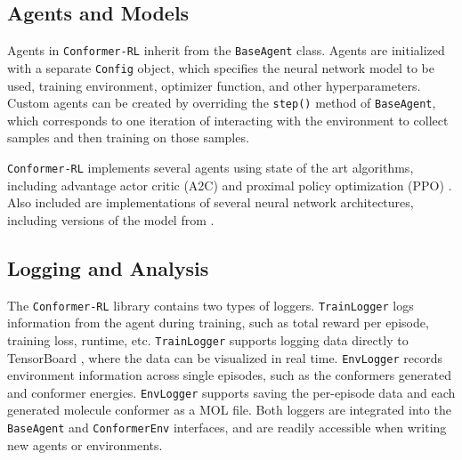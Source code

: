 \documentclass[twoside,11pt]{article}
\newcommand{\code}[1]{\texttt{#1}}
\newcommand{\titleofpaper}{Conformer-RL}
\newcommand{\genComment}[2]{\ifnum\comments=1{\color{#1}{\textsf{\footnotesize #2}}}\fi}
\newcommand{\josh}[1]{\genComment{purple}{[JK:#1]}}
\begin{document}

\subsection{Agents and Models}
Agents in \code{\titleofpaper} inherit from the \code{BaseAgent} class. Agents are initialized with a separate \code{Config} object, which specifies the neural network model to be used, training environment, optimizer function, and other hyperparameters. Custom agents can be created by overriding the \code{step()} method of \code{BaseAgent}, which corresponds to one iteration of interacting with the environment to collect samples and then training on those samples. 

\code{\titleofpaper} implements several agents using state of the art algorithms, including advantage actor critic (A2C) \citep{wu2017a2c} and proximal policy optimization (PPO) \citep{schulman2017ppo}. Also included are implementations of several neural network architectures, including versions of the model from \citep{gogineni2020torsionnet}.

\subsection{Logging and Analysis}
The \code{\titleofpaper} library contains two types of loggers. \code{TrainLogger} logs information from the agent during training, such as total reward per episode, training loss, runtime, etc. \code{TrainLogger} supports logging data directly to TensorBoard \citep{tensorflow2015-whitepaper}, where the data can be visualized in real time. \code{EnvLogger} records environment information across single episodes, such as the conformers generated and conformer energies. \code{EnvLogger} supports saving the per-episode data and each generated molecule conformer as a MOL file. Both loggers are integrated into the \code{BaseAgent} and \code{ConformerEnv} interfaces, and are readily accessible when writing new agents or environments.
\end{document}

